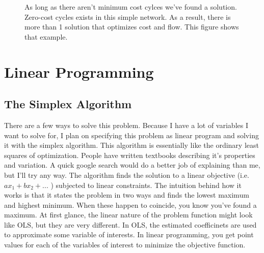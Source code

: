 \documentclass{report}
\begin{document}
\begin{figure}
\centering
\begin{framed}
\caption{As long as there aren't minimum cost cylces we've found a solution. Zero-cost cycles exists in this simple network. As a result, there is more than 1 solution that optimizes cost and flow. This figure shows that example.}
\label{fig:example6}
\end{framed}
\end{figure}

\section{Linear Programming}

\subsection{The Simplex Algorithm}

There are a few ways to solve this problem. Because I have a lot of variables I want to solve for, I plan on specifying this problem as linear program and solving it with the simplex algorithm. This algorithm is essentially like the ordinary least squares of optimization. People have written textbooks describing it's properties and variation. A quick google search would do a better job of explaining than me, but I'll try any way. The algorithm finds the solution to a linear objective (i.e. $a x_1 +b x_2 + ...$ ) subjected to linear constraints. The intuition behind how it works is that it states the problem in two ways and finds the lowest maximum and highest minimum. When these happen to coincide,  you know you've found a maximum. At first glance, the  linear nature of the problem function might look like OLS, but they are very different. In OLS, the estimated coefficinets are used to approximate some variable of interests. In linear programming, you get point values for each of the variables of interest to minimize the objective function.
\end{document}
